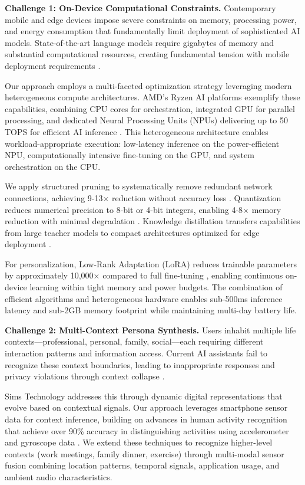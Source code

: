 \documentclass[11pt]{article}
\begin{document}
\textbf{Challenge 1: On-Device Computational Constraints.}
Contemporary mobile and edge devices impose severe constraints on memory, 
processing power, and energy consumption that fundamentally limit deployment 
of sophisticated AI models. State-of-the-art language models require 
gigabytes of memory and substantial computational resources, creating 
fundamental tension with mobile deployment requirements \cite{han2016deep}. 

Our approach employs a multi-faceted optimization strategy leveraging modern 
heterogeneous compute architectures. AMD's Ryzen AI platforms exemplify these 
capabilities, combining CPU cores for orchestration, integrated GPU for 
parallel processing, and dedicated Neural Processing Units (NPUs) delivering 
up to 50 TOPS for efficient AI inference \cite{amd2024ryzenai}. This 
heterogeneous architecture enables workload-appropriate execution: low-latency 
inference on the power-efficient NPU, computationally intensive fine-tuning 
on the GPU, and system orchestration on the CPU.

We apply structured pruning to systematically remove redundant network 
connections, achieving 9-13$\times$ reduction without accuracy loss 
\cite{liang2021pruning}. Quantization reduces numerical precision to 8-bit 
or 4-bit integers, enabling 4-8$\times$ memory reduction with minimal 
degradation \cite{gholami2022survey}. Knowledge distillation transfers 
capabilities from large teacher models to compact architectures optimized 
for edge deployment \cite{hinton2015distilling}.

For personalization, Low-Rank Adaptation (LoRA) reduces trainable parameters 
by approximately 10,000$\times$ compared to full fine-tuning \cite{hu2022lora}, 
enabling continuous on-device learning within tight memory and power budgets. 
The combination of efficient algorithms and heterogeneous hardware enables 
sub-500ms inference latency and sub-2GB memory footprint while maintaining 
multi-day battery life.

\textbf{Challenge 2: Multi-Context Persona Synthesis.}
Users inhabit multiple life contexts---professional, personal, family, social---each requiring different interaction patterns and information access. Current AI assistants fail to recognize these context boundaries, leading to inappropriate responses and privacy violations through context collapse \cite{dey2001understanding}. 

Sims Technology addresses this through dynamic digital representations that evolve based on contextual signals. Our approach leverages smartphone sensor data for context inference, building on advances in human activity recognition that achieve over 90\% accuracy in distinguishing activities using accelerometer and gyroscope data \cite{wang2019deep}. We extend these techniques to recognize higher-level contexts (work meetings, family dinner, exercise) through multi-modal sensor fusion combining location patterns, temporal signals, application usage, and ambient audio characteristics.
\end{document}
